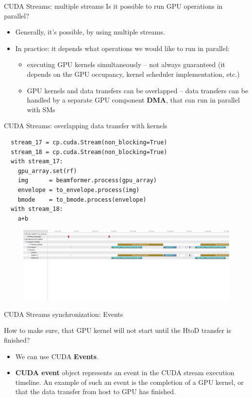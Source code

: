 \documentclass[xcolor=table]{beamer}
\begin{document}
\begin{frame}{CUDA Streams: multiple streams}
  Is it possible to run GPU operations in parallel?
  \begin{itemize}
    \item Generally, it's possible, by using multiple streams.
    \item In practice: it depends what operations we would like to run in parallel:
      \begin{itemize}
        \item executing GPU kernels simultaneously -- not always guaranteed (it depends on the GPU occupancy, kernel scheduler implementation, etc.)
        \item GPU kernels and data transfers can be overlapped -- data transfers can be handled by a separate GPU component \textbf{DMA}, that can run in parallel with SMs
      \end{itemize}
  \end{itemize}
\end{frame}

\begin{frame}[fragile]{CUDA Streams: overlapping data transfer with kernels}

  \begin{lstlisting}
  stream_17 = cp.cuda.Stream(non_blocking=True)
  stream_18 = cp.cuda.Stream(non_blocking=True) 
  with stream_17:
    gpu_array.set(rf)
    img      = beamformer.process(gpu_array)
    envelope = to_envelope.process(img)
    bmode    = to_bmode.process(envelope)
  with stream_18:
    a+b
  \end{lstlisting}

  \begin{figure}
    \includegraphics[scale=0.2]{imgs/concurrent_streams.png}
  \end{figure}  
\end{frame}

\begin{frame}{CUDA Streams synchronization: Events}

  How to make sure, that GPU kernel will not start until the HtoD transfer is finished?
  \begin{itemize}
    \item We can use CUDA \textbf{Events}.
    \item \textbf{CUDA event} object represents an event in the CUDA stream execution timeline. An example of such an event is the completion of a GPU kernel, or that the data transfer from host to GPU has finished.
  \end{itemize}

\end{frame}
\end{document}

